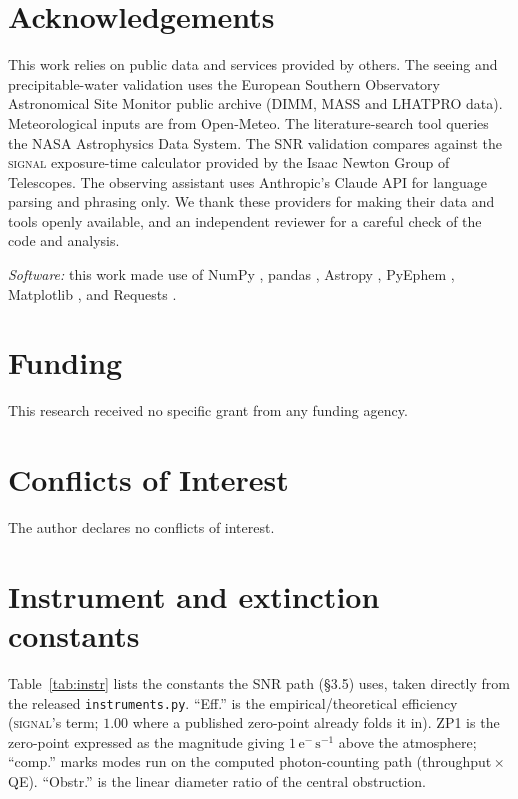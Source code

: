 \documentclass[11pt]{article}
\begin{document}
\section*{Acknowledgements}
This work relies on public data and services provided by others. The seeing and
precipitable-water validation uses the European Southern Observatory Astronomical
Site Monitor public archive (DIMM, MASS and LHATPRO data). Meteorological inputs are
from Open-Meteo. The literature-search tool queries the NASA Astrophysics Data
System. The SNR validation compares against the \textsc{signal} exposure-time
calculator provided by the Isaac Newton Group of Telescopes. The observing assistant
uses Anthropic's Claude API for language parsing and phrasing only. We thank these
providers for making their data and tools openly available, and an independent
reviewer for a careful check of the code and analysis.

\emph{Software:} this work made use of NumPy \cite{harris2020}, pandas \cite{pandas},
Astropy \cite{astropy2013,astropy2018,astropy2022}, PyEphem \cite{pyephem},
Matplotlib \cite{hunter2007}, and Requests \cite{requests}.

\section*{Funding}
This research received no specific grant from any funding agency.

\section*{Conflicts of Interest}
The author declares no conflicts of interest.

\appendix
\section{Instrument and extinction constants}
\label{app:constants}
Table~\ref{tab:instr} lists the constants the SNR path (\S3.5) uses, taken directly
from the released \texttt{instruments.py}. ``Eff.'' is the empirical/theoretical
efficiency (\textsc{signal}'s term; $1.00$ where a published zero-point already folds
it in). ZP1 is the zero-point expressed as the magnitude giving
$1\,\mathrm{e}^-\,\mathrm{s}^{-1}$ above the atmosphere; ``comp.'' marks modes run on
the computed photon-counting path (throughput\,$\times$\,QE). ``Obstr.'' is the
linear diameter ratio of the central obstruction.
\end{document}
